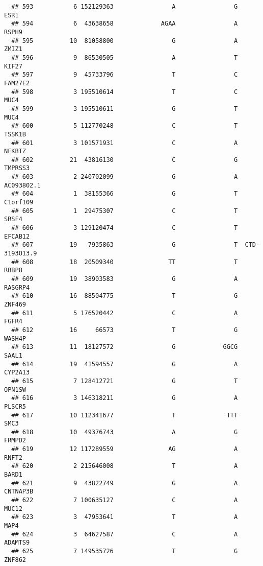 \documentclass[12pt,twoside]{reedthesis}
\theoremstyle{definition}
\theoremstyle{definition}
\theoremstyle{remark}
\begin{document}
\begin{verbatim}
  ## 593           6 152129363                A                G           ESR1
  ## 594           6  43638658             AGAA                A          RSPH9
  ## 595          10  81058800                G                A          ZMIZ1
  ## 596           9  86530505                A                T          KIF27
  ## 597           9  45733796                T                C        FAM27E2
  ## 598           3 195510614                T                C           MUC4
  ## 599           3 195510611                G                T           MUC4
  ## 600           5 112770248                C                T         TSSK1B
  ## 601           3 101571931                C                A         NFKBIZ
  ## 602          21  43816130                C                G        TMPRSS3
  ## 603           2 240702099                G                A     AC093802.1
  ## 604           1  38155366                G                T       C1orf109
  ## 605           1  29475307                C                T          SRSF4
  ## 606           3 129120474                C                T        EFCAB12
  ## 607          19   7935863                G                T  CTD-3193O13.9
  ## 608          18  20509340               TT                T          RBBP8
  ## 609          19  38903583                G                A        RASGRP4
  ## 610          16  88504775                T                G         ZNF469
  ## 611           5 176520442                C                A          FGFR4
  ## 612          16     66573                T                G         WASH4P
  ## 613          11  18127572                G             GGCG          SAAL1
  ## 614          19  41594557                G                A        CYP2A13
  ## 615           7 128412721                G                T         OPN1SW
  ## 616           3 146318211                G                A         PLSCR5
  ## 617          10 112341677                T              TTT           SMC3
  ## 618          10  49376743                A                G         FRMPD2
  ## 619          12 117289559               AG                A          RNFT2
  ## 620           2 215646008                T                A          BARD1
  ## 621           9  43822749                G                A       CNTNAP3B
  ## 622           7 100635127                C                A          MUC12
  ## 623           3  47953641                T                A           MAP4
  ## 624           3  64627587                C                A        ADAMTS9
  ## 625           7 149535726                T                G         ZNF862

\end{verbatim}
\end{document}
